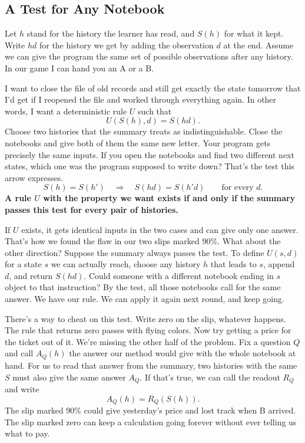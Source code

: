 \documentclass[12pt,oneside]{article}
\newcommand{\secao}[1]{\Needspace{5.2\baselineskip}\subsection*{#1}}
\newcommand{\bookanchor}[1]{\phantomsection\label{#1}}
\begin{document}
\secao{A Test for Any Notebook}
Let\bookanchor{topic-07-1} $h$ stand for the history the learner has read, and $S(h)$ for what it kept. Write $hd$ for the history we get by adding the observation $d$ at the end. Assume we can give the program the same set of possible observations after any history. In our game I can hand you an A or a B.

I want to close the file of old records and still get exactly the state tomorrow that I'd get if I reopened the file and worked through everything again. In other words, I want a deterministic rule $U$ such that
\[
                        U(S(h),d)=S(hd).
\]
Choose two histories that the summary treats as indistinguishable. Close the notebooks and give both of them the same new letter. Your program gets precisely the same inputs. If you open the notebooks and find two different next states, which one was the program supposed to write down? That's the test this arrow expresses.
\[
              S(h)=S(h')\quad\Longrightarrow\quad S(hd)=S(h'd)
              \qquad\text{for every }d .
\]
\textbf{A rule $U$ with the property we want exists if and only if the summary passes this test for every pair of histories.}

If $U$ exists, it gets identical inputs in the two cases and can give only one answer. That's how we found the flaw in our two slips marked $90\%$. What about the other direction? Suppose the summary always passes the test. To define $U(s,d)$ for a state $s$ we can actually reach, choose any history $h$ that leads to $s$, append $d$, and return $S(hd)$. Could someone with a different notebook ending in $s$ object to that instruction? By the test, all those notebooks call for the same answer. We have our rule. We can apply it again next round, and keep going.

There's a way to cheat on this test. Write zero on the slip, whatever happens. The rule that returns zero passes with flying colors. Now try getting a price for the ticket out of it. We're missing the other half of the problem. Fix a question $Q$ and call $A_Q(h)$ the answer our method would give with the whole notebook at hand. For us to read that answer from the summary, two histories with the same $S$ must also give the same answer $A_Q$. If that's true, we can call the readout $R_Q$ and write
\[
                         A_Q(h)=R_Q(S(h)).
\]
The slip marked $90\%$ could give yesterday's price and lost track when B arrived. The slip marked zero can keep a calculation going forever without ever telling us what to pay.
\end{document}
